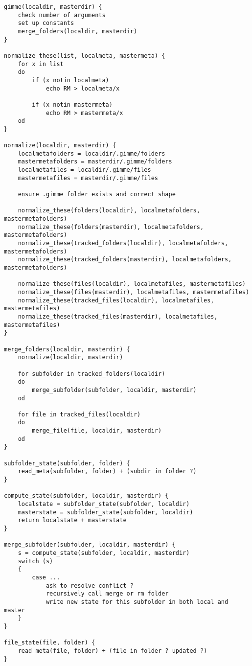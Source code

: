 \documentclass[10pt,a4paper]{article}
\begin{document}
\begin{lstlisting}[frame=ltbr, tabsize=4]
gimme(localdir, masterdir) {
	check number of arguments
	set up constants
	merge_folders(localdir, masterdir)
}

normalize_these(list, localmeta, mastermeta) {
	for x in list
	do
		if (x notin localmeta)
			echo RM > localmeta/x
			
		if (x notin mastermeta)
			echo RM > mastermeta/x
	od
}

normalize(localdir, masterdir) {
	localmetafolders = localdir/.gimme/folders
	mastermetafolders = masterdir/.gimme/folders
	localmetafiles = localdir/.gimme/files
	mastermetafiles = masterdir/.gimme/files
	
	ensure .gimme folder exists and correct shape

	normalize_these(folders(localdir), localmetafolders, mastermetafolders)
	normalize_these(folders(masterdir), localmetafolders, mastermetafolders)
	normalize_these(tracked_folders(localdir), localmetafolders, mastermetafolders)
	normalize_these(tracked_folders(masterdir), localmetafolders, mastermetafolders)
	
	normalize_these(files(localdir), localmetafiles, mastermetafiles)
	normalize_these(files(masterdir), localmetafiles, mastermetafiles)
	normalize_these(tracked_files(localdir), localmetafiles, mastermetafiles)
	normalize_these(tracked_files(masterdir), localmetafiles, mastermetafiles)
}

merge_folders(localdir, masterdir) {
	normalize(localdir, masterdir)
	
	for subfolder in tracked_folders(localdir)
	do
		merge_subfolder(subfolder, localdir, masterdir)
	od
	
	for file in tracked_files(localdir)
	do
		merge_file(file, localdir, masterdir)
	od
}

subfolder_state(subfolder, folder) {
	read_meta(subfolder, folder) + (subdir in folder ?)
}

compute_state(subfolder, localdir, masterdir) {
	localstate = subfolder_state(subfolder, localdir)
	masterstate = subfolder_state(subfolder, localdir)
	return localstate + masterstate
}
	
merge_subfolder(subfolder, localdir, masterdir) {
	s = compute_state(subfolder, localdir, masterdir)
	switch (s)
	{
		case ...
			ask to resolve conflict ?
			recursively call merge or rm folder
			write new state for this subfolder in both local and master
	}
}

file_state(file, folder) {
	read_meta(file, folder) + (file in folder ? updated ?)
}


\end{lstlisting}
\end{document}
